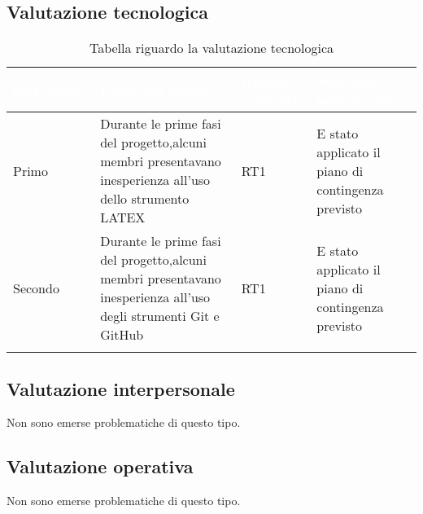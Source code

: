 \subsection{Valutazione tecnologica}
{
    \setlength{\freewidth}{\dimexpr\textwidth-10\tabcolsep}
    \renewcommand{\arraystretch}{1.5}
    \centering
    \setlength{\aboverulesep}{0pt}
    \setlength{\belowrulesep}{0pt}
    \begin{longtable}{C{.25\freewidth} C{.257\freewidth} C{.16\freewidth} C{.4\freewidth}}
       \toprule
    \textcolor{white}{\textbf{Incremento}}&
    \textcolor{white}{\textbf{Problema emerso}}&
    \textcolor{white}{\textbf{Rischio associato}}&
    \textcolor{white}{\textbf{Soluzione migliorativa}}\\	
    \toprule
    \endhead
    
Primo & Durante le prime fasi del progetto,alcuni membri presentavano inesperienza all'uso dello strumento LATEX & RT1 & E stato applicato il piano di contingenza
previsto \\
Secondo & Durante le prime fasi del progetto,alcuni membri presentavano inesperienza all'uso degli strumenti Git e GitHub & RT1 & E stato applicato il piano di contingenza
previsto\\

 \bottomrule
 \caption{Tabella riguardo la valutazione tecnologica}
\end{longtable}
}

\subsection{Valutazione interpersonale}
Non sono emerse problematiche di questo tipo. 

\subsection{Valutazione operativa}
Non sono emerse problematiche di questo tipo.